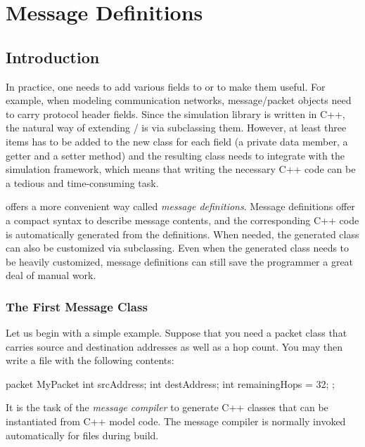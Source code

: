 \chapter{Message Definitions}
\label{cha:msg-def}

\section{Introduction}
\label{sec:msg-defs:intro}

In practice, one needs to add various fields to  or
 to make them useful. For example, when modeling
communication networks, message/packet objects need to carry protocol
header fields. Since the simulation library is written in C++, the natural
way of extending / is via subclassing
them. However, at least three items has to be added to the new class for
each field (a private data member, a getter and a setter method) and the
resulting class needs to integrate with the simulation framework, which
means that writing the necessary C++ code can be a tedious and
time-consuming task.

{\opp} offers a more convenient way called \textit{message definitions}.
Message definitions offer a compact syntax to describe message contents,
and the corresponding C++ code is automatically generated from the
definitions. When needed, the generated class can also be customized via
subclassing. Even when the generated class needs to be heavily customized,
message definitions can still save the programmer a great deal of manual
work.


\subsection{The First Message Class}
\label{sec:msg-defs:first-msg-class}

Let us begin with a simple example. Suppose that you need a packet class that
carries source and destination addresses as well as a hop count. You may then
write a  file with the following contents:

\begin{msg}
packet MyPacket
{
     int srcAddress;
     int destAddress;
     int remainingHops = 32;
};
\end{msg}

It is the task of the \textit{message compiler} to generate C++ classes
that can be instantiated from C++ model code. The message compiler is
normally invoked automatically for  files during build.

